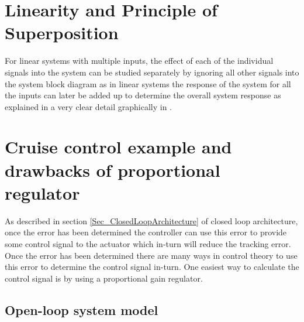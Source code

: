 \section{Linearity and Principle of Superposition}

For linear systems with multiple inputs, the effect of each of the individual signals into the system can be studied separately by ignoring all other signals into the system block diagram as in linear systems the response of the system for all the inputs can later be added up to determine the overall system response as explained in a very clear detail graphically in \cite[t.41.19]{RickHill_13}.

\section{Cruise control example and drawbacks of proportional regulator}

As described in section \ref{Sec_ClosedLoopArchitecture} of closed loop architecture, once the error has been determined the controller can use this error to provide some control signal to the actuator which in-turn will reduce the tracking error. Once the error has been determined there are many ways in control theory to use this error to determine the control signal in-turn. One easiest way to calculate the control signal is by using a proportional gain regulator.

\subsection{Open-loop system model}

